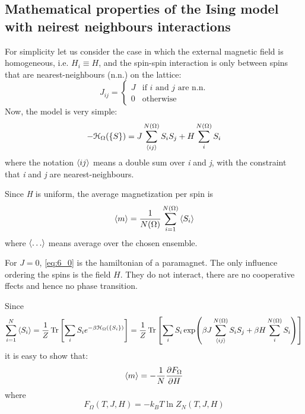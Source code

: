 \documentclass[../main/main.tex]{subfiles}
\begin{document}
\subsection{Mathematical properties of the Ising model with neirest neighbours interactions}
For simplicity let us consider the case in which the external magnetic field is homogeneous, i.e. \( H_i \equiv H \), and the spin-spin interaction is only between spins that are nearest-neighbours (n.n.) on the lattice:
\begin{equation}
J_{ij} =
  \begin{cases}
  J & \text{if } i \text{ and } j \text{ are n.n.} \\
  0 & \text{otherwise}
  \end{cases}
\end{equation}
Now, the model is very simple:
\begin{equation}
  - \mathcal{H}_ \Omega ( \{ S \}  ) = J \sum_{\expval{ij} }^{N (\Omega )} S_i S_j + H \sum_{i}^{N(\Omega )} S_i
  \label{eq:6_0}
\end{equation}
where the notation \( \expval{ij}  \) means a double sum over \emph{i} and \emph{j}, with the constraint that \emph{i} and \emph{j} are nearest-neighbours.

Since \emph{H} is uniform, the average magnetization per spin is
\begin{equation}
  \expval{m} = \frac{1}{N (\Omega )} \sum_{i=1}^{N (\Omega )} \expval{S_i}
\end{equation}
where \( \expval{\dots}  \)  means average over the chosen ensemble.

\begin{remark}
For \( J=0 \), \eqref{eq:6_0}  is the hamiltonian of a paramagnet. The only influence ordering the spins is the field \( H \). They do not interact, there are no cooperative ffects and hence no phase transition.
\end{remark}

Since
\begin{equation}
  \sum_{i=1}^{N} \expval{S_i} = \frac{1}{Z} \Tr \qty[\sum_{i}^{} S_i  e^{-\beta \mathcal{H}_ \Omega (\{ S_i \}  )} ]  = \frac{1}{Z} \Tr \qty[\sum_{i}^{} S_i \exp (\beta  J \sum_{\expval{ij} }^{N(\Omega )} S_i S_j + \beta H \sum_{i}^{N(\Omega )} S_i  )  ]
\end{equation}
it is easy to show that:
\begin{equation}
  \expval{m} = - \frac{1}{N} \pdv{F_ \Omega }{H}
\end{equation}
where
\begin{equation}
  F_ \Omega (T,J,H) = - k_B T \ln{Z_N (T,J,H)}
\end{equation}
\end{document}
